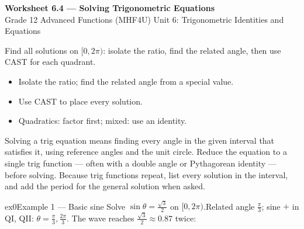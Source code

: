 \documentclass[11pt]{article}
\begin{document}
\begin{center}
{\LARGE\bfseries\color{titleblue}Worksheet 6.4 --- Solving Trigonometric Equations}\\[2pt]
{\small Grade 12 Advanced Functions (MHF4U) \textperiodcentered{} Unit 6: Trigonometric Identities and Equations}
\end{center}

\begin{ideabox}
Find all solutions on $[0,2\pi)$: isolate the ratio, find the related angle, then use CAST for each quadrant.
\begin{itemize}[leftmargin=*,itemsep=2pt]
  \item Isolate the ratio; find the related angle from a special value.
  \item Use CAST to place every solution.
  \item Quadratics: factor first; mixed: use an identity.
\end{itemize}
\end{ideabox}

\begin{learnbox}
Solving a trig equation means finding every angle in the given interval that satisfies it, using reference angles and the unit circle.
Reduce the equation to a single trig function — often with a double angle or Pythagorean identity — before solving.
Because trig functions repeat, list every solution in the interval, and add the period for the general solution when asked.
\end{learnbox}


\begin{example}{ex0}{Example 1 --- Basic sine}
Solve $\sin\theta=\tfrac{\sqrt3}{2}$ on $[0,2\pi)$.\soln Related angle $\tfrac{\pi}{3}$; sine $+$ in QI, QII: $\theta=\tfrac{\pi}{3},\tfrac{2\pi}{3}$. The wave reaches $\tfrac{\sqrt3}{2}\approx0.87$ twice:\begin{center}\end{center}
\end{example}
\end{document}
